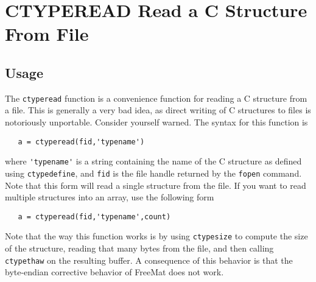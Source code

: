 \section{CTYPEREAD Read a C Structure From File}

\subsection{Usage}

The \verb|ctyperead| function is a convenience function for
reading a C structure from a file.  This is generally a
very bad idea, as direct writing of C structures to files
is notoriously unportable.  Consider yourself warned.  The
syntax for this function is
\begin{verbatim}
   a = ctyperead(fid,'typename')
\end{verbatim}
where \verb|'typename'| is a string containing the name of the
C structure as defined using \verb|ctypedefine|, and \verb|fid|
is the file handle returned by the \verb|fopen| command.  Note
that this form will read a single structure from the file.
If you want to read multiple structures into an array, 
use the following form
\begin{verbatim}
   a = ctyperead(fid,'typename',count)
\end{verbatim}
Note that the way this function works is by using \verb|ctypesize|
to compute the size of the structure, reading that many bytes
from the file, and then calling \verb|ctypethaw| on the resulting
buffer.  A consequence of this behavior is that the byte-endian
corrective behavior of FreeMat does not work.
